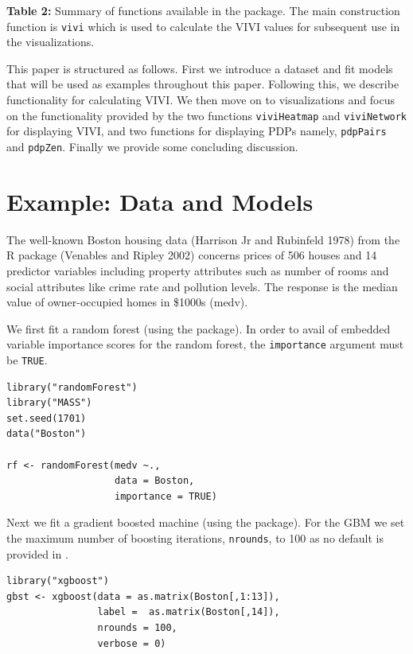 \textbf{Table 2:} Summary of functions available in the  package. The main construction function is \texttt{vivi} which is used to calculate the VIVI values for subsequent use in the visualizations.

This paper is structured as follows. First we introduce a dataset and fit models that will be used as examples throughout this paper. Following this, we describe  functionality for calculating VIVI. We then move on to visualizations and focus on the functionality provided by the two functions \texttt{viviHeatmap} and \texttt{viviNetwork} for displaying VIVI, and two functions for displaying PDPs namely, \texttt{pdpPairs} and \texttt{pdpZen}. Finally we provide some concluding discussion.

\hypertarget{datamodel}{%
\section{Example: Data and Models}\label{datamodel}}

The well-known Boston housing data (Harrison Jr and Rubinfeld 1978) from the R package  (Venables and Ripley 2002) concerns prices of 506 houses and 14 predictor variables including property attributes such as number of rooms and social attributes like crime rate and pollution levels. The response is the median value of owner-occupied homes in \$1000s (medv).

We first fit a random forest (using the  package). In order to avail of embedded variable importance scores for the random forest, the \texttt{importance} argument must be \texttt{TRUE}.

\begin{verbatim}
library("randomForest") 
library("MASS")
set.seed(1701)  
data("Boston")

rf <- randomForest(medv ~., 
                   data = Boston, 
                   importance = TRUE)
\end{verbatim}

Next we fit a gradient boosted machine (using the  package). For the GBM we set the maximum number of boosting iterations, \texttt{nrounds}, to 100 as no default is provided in .

\begin{verbatim}
library("xgboost") 
gbst <- xgboost(data = as.matrix(Boston[,1:13]), 
                label =  as.matrix(Boston[,14]),
                nrounds = 100,
                verbose = 0)
\end{verbatim}

